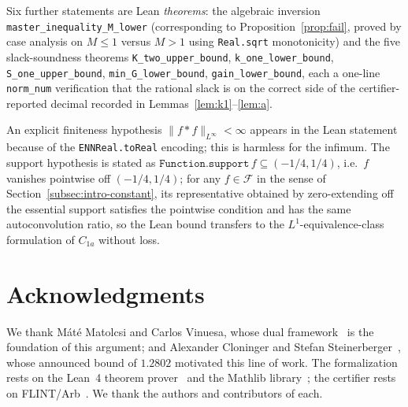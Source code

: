 \documentclass[11pt, letterpaper]{article}
\theoremstyle{plain}
\theoremstyle{definition}
\newcommand{\Linf}{L^\infty}
\begin{document}
Six further statements are Lean \emph{theorems}: the algebraic
inversion \texttt{master\_inequality\_M\_lower} (corresponding to
Proposition~\ref{prop:fail}, proved by case analysis on $M\le 1$ versus
$M>1$ using \texttt{Real.sqrt} monotonicity) and the five
slack-soundness theorems \texttt{K\_two\_upper\_bound},
\texttt{k\_one\_lower\_bound}, \texttt{S\_one\_upper\_bound},
\texttt{min\_G\_lower\_bound}, \texttt{gain\_lower\_bound}, each a
one-line \texttt{norm\_num} verification that the rational slack is on
the correct side of the certifier-reported decimal recorded in
Lemmas~\ref{lem:k1}--\ref{lem:a}.

An explicit finiteness hypothesis $\|f*f\|_{\Linf}<\infty$ appears in
the Lean statement because of the \texttt{ENNReal.toReal} encoding;
this is harmless for the infimum.  The support hypothesis is stated
as $\texttt{Function.support}\,f\subseteq(-1/4,1/4)$, i.e.\
$f$ vanishes pointwise off $(-1/4,1/4)$; for any
$f\in\mathcal{F}$ in the sense of Section~\ref{subsec:intro-constant},
its representative obtained by zero-extending off the essential
support satisfies the pointwise condition and has the same
autoconvolution ratio, so the Lean bound transfers to the
$L^1$-equivalence-class formulation of $C_{1a}$ without loss.

\section*{Acknowledgments}

We thank M\'at\'e Matolcsi and Carlos Vinuesa, whose dual
framework~\cite{MV10} is the foundation of this argument; and
Alexander Cloninger and Stefan Steinerberger~\cite{CS17}, whose
announced bound of $1.2802$ motivated this line of work.  The
formalization rests on the Lean~4 theorem prover~\cite{Lean} and the
Mathlib library~\cite{Mathlib}; the certifier rests on
FLINT/Arb~\cite{Flint}.  We thank the authors and contributors of
each.


\end{document}
